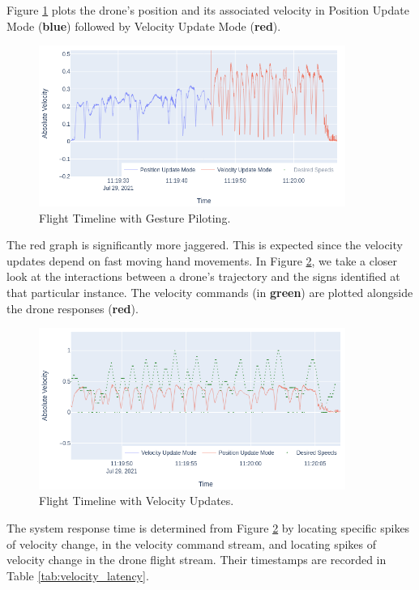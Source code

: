 Figure \ref{fig:velocities} plots the drone's position and its associated velocity in Position Update Mode (\textbf{blue}) followed by Velocity Update Mode (\textbf{red}).

\begin{figure}[!h]
    \raggedright
    \includegraphics[width=10cm]{images/hdi_graphs/actual_velocities.png}
    \caption{Flight Timeline with Gesture Piloting.}
    \label{fig:velocities}
\end{figure}

The red graph is significantly more jaggered. This is expected since the velocity updates depend on fast moving hand movements. In Figure \ref{fig:responsiveness}, we take a closer look at the interactions between a drone's trajectory and the signs identified at that particular instance. The  velocity commands (in \textbf{green}) are plotted alongside the drone responses (\textbf{red}). 


    
\begin{figure}[!h]
    \raggedright
    \includegraphics[width=10cm]{images/hdi_graphs/desired_velocities.png}

    \caption{Flight Timeline with Velocity Updates.}
    \label{fig:responsiveness}
\end{figure}

The system response time is determined from Figure \ref{fig:responsiveness} by locating specific spikes of velocity change, in the velocity command stream, and locating spikes of velocity change in the drone flight stream. Their timestamps are recorded in Table \ref{tab:velocity_latency}.

